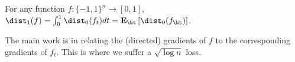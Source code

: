 \begin{lemma}\label{lem:bry}
	\noindent
	For any function $f:\{-1,1\}^n \to [0,1]$, $\dist_1(f) = \int_0^1 \dist_0(f_t) dt = \Exp_{\bt} \left[ \dist_0(f_{\bt})\right]$.
\end{lemma}

The main work is in relating the (directed) gradients of $f$ to the corresponding
gradients of $f_t$. This is where we suffer a $\sqrt{\log n}$ loss.
 
% 
% 
% 


